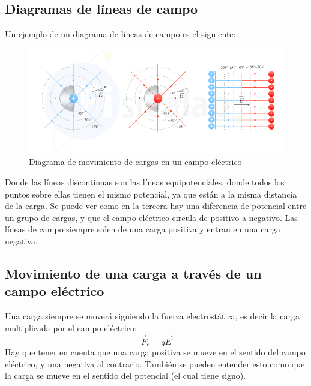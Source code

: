 \documentclass[arial,a4paper,print]{article}
\begin{document}
\subsection{Diagramas de líneas de campo}
Un ejemplo de un diagrama de líneas de campo es el siguiente:
\begin{figure}[H]
	\centering
	\includegraphics[width=0.6\linewidth]{figures/potencial-e-intensidad}
	\caption{Diagrama de movimiento de cargas en un campo eléctrico}
	\label{fig:potencial-e-intensidad}
\end{figure}
Donde las líneas discontinuas son las líneas equipotenciales, donde todos los puntos sobre ellas tienen el mismo potencial, ya que están a la misma distancia de la carga. Se puede ver como en la tercera hay una diferencia de potencial entre un grupo de cargas, y que el campo eléctrico circula de positivo a negativo. Las líneas de campo siempre salen de una carga positiva y entran en una carga negativa.

\subsection{Movimiento de una carga a través de un campo eléctrico}
Una carga siempre se moverá siguiendo la fuerza electrostática, es decir la carga multiplicada por el campo eléctrico:
\begin{equation*}
	\overrightarrow{F}_{e} = q\overrightarrow{E}
\end{equation*}
Hay que tener en cuenta que una carga positiva se mueve en el sentido del campo eléctrico, y una negativa al contrario. También se pueden entender esto como que la carga se mueve en el sentido del potencial (el cual tiene signo). 
\end{document}
